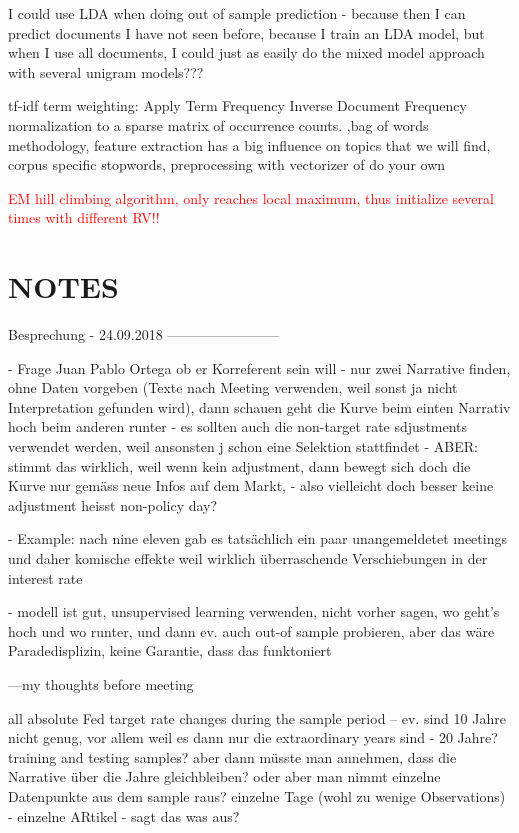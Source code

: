 \documentclass[11pt,a4paper,english,oneside]{book}
\numberwithin{equation}{chapter}
\begin{document}
I could use LDA when doing out of sample prediction - because then I can predict documents I have not seen before, because I train an LDA model, but when I use all documents, I could just as easily do the mixed model approach with several unigram models???

tf-idf term weighting: Apply Term Frequency Inverse Document Frequency normalization to a sparse matrix of occurrence counts. ,bag of words methodology, feature extraction has a big influence on topics that we will find, corpus specific stopwords, preprocessing with vectorizer of do your own

\textcolor{red}{EM hill climbing algorithm, only reaches local maximum, thus initialize several times with different RV!! }

\section{NOTES}
Besprechung - 24.09.2018
------------------------

- Frage Juan Pablo Ortega ob er Korreferent sein will
- nur zwei Narrative finden, ohne Daten vorgeben (Texte nach Meeting verwenden, weil sonst ja nicht Interpretation gefunden wird), dann schauen geht die Kurve beim einten Narrativ hoch beim anderen runter
- es sollten auch die non-target rate sdjustments verwendet werden, weil ansonsten j schon eine Selektion stattfindet - ABER: stimmt das wirklich, weil wenn kein adjustment, dann bewegt sich doch die Kurve nur gemäss neue Infos auf dem Markt, - also vielleicht doch besser keine adjustment heisst non-policy day?

- Example: nach nine eleven gab es tatsächlich ein paar unangemeldetet meetings und daher komische effekte weil wirklich überraschende Verschiebungen in der interest rate

- modell ist gut, unsupervised learning verwenden, nicht vorher sagen, wo geht's hoch und wo runter, und dann ev. auch out-of sample probieren, aber das wäre Paradedisplizin, keine Garantie, dass das funktoniert

---my thoughts before meeting

all absolute Fed target rate changes during the sample period -- ev. sind 10 Jahre nicht genug, vor allem weil es dann nur die extraordinary years sind - 20 Jahre? training and testing samples? aber dann müsste man annehmen, dass die Narrative über die Jahre gleichbleiben? oder aber man nimmt einzelne Datenpunkte aus dem sample raus? einzelne Tage (wohl zu wenige Observations) - einzelne ARtikel - sagt das was aus?
\end{document}
